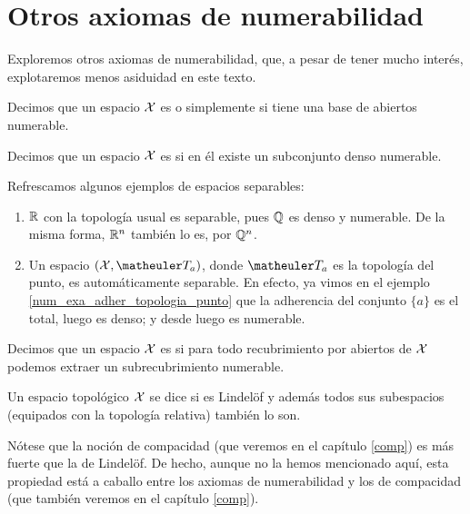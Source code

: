 \section{Otros axiomas de numerabilidad}
Exploremos otros axiomas de numerabilidad, que, a pesar de tener mucho interés, explotaremos menos asiduidad en este texto.
\begin{defi}
	Decimos que un espacio $\mathcal{X}$ es  o simplemente  si tiene una base de abiertos numerable.
\end{defi}

\begin{defi}[Separable]
	Decimos que un espacio $\mathcal{X}$ es  si en él existe un subconjunto denso numerable.
\end{defi}

\begin{exa}
	Refrescamos algunos ejemplos de espacios separables:
	\begin{enumerate}
		\item $\mathbb{R}$ con la topología usual es separable, pues $\mathbb{Q}$ es denso y numerable. De la misma forma, $\mathbb{R}^n$ también lo es, por $\mathbb{Q}^n$. 
		
		\item Un espacio $(\X,\T_a)$, donde $\T_a$ es la topología del punto, es automáticamente separable. En efecto, ya vimos en el ejemplo \ref{num_exa_adher_topologia_punto} que la adherencia del conjunto $\{a\}$ es el total, luego es denso; y desde luego es numerable. \qedhere
	\end{enumerate}
\end{exa}

\begin{defi}[Lindelöf]
	\label{lindel}
	Decimos que un espacio $\mathcal{X}$ es  si para todo recubrimiento por abiertos de $\mathcal{X}$ podemos extraer un subrecubrimiento numerable.
\end{defi}
\begin{defi}
	Un espacio topológico $\mathcal{X}$ se dice  si es Lindelöf y además todos sus subespacios (equipados con la topología relativa) también lo son.
\end{defi}

\begin{obs}
	Nótese que la noción de compacidad (que veremos en el capítulo \ref{comp}) es más fuerte que la de Lindelöf. De hecho, aunque no la hemos mencionado aquí, esta propiedad está a caballo entre los axiomas de numerabilidad y los de compacidad (que también veremos en el capítulo \ref{comp}).
\end{obs}

